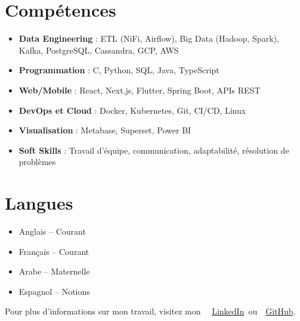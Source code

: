 \documentclass[10pt,a4paper,sans]{moderncv}
\begin{document}
\section{\fontsize{11}{12.1}\selectfont Compétences}
\vspace{-6pt}
\begin{itemize}[leftmargin=0.3cm, itemsep=-2pt, topsep=0pt, partopsep=0pt, parsep=0pt]
  \item \textbf{Data Engineering} : ETL (NiFi, Airflow), Big Data (Hadoop, Spark), Kafka, PostgreSQL, Cassandra, GCP, AWS
  \item \textbf{Programmation} : C, Python, SQL, Java, TypeScript
  \item \textbf{Web/Mobile} : React, Next.js, Flutter, Spring Boot, APIs REST
  \item \textbf{DevOps et Cloud} : Docker, Kubernetes, Git, CI/CD, Linux
  \item \textbf{Visualisation} : Metabase, Superset, Power BI
  \item \textbf{Soft Skills} : Travail d’équipe, communication, adaptabilité, résolution de problèmes
\end{itemize}

\vspace{-17pt}
\section{\fontsize{11}{12.1}\selectfont Langues}
\vspace{-16pt}
\begin{multicols}{2}
\begin{itemize}[leftmargin=0.3cm, itemsep=-2pt, topsep=0pt, partopsep=0pt, parsep=0pt]
    \item Anglais – Courant
    \item Français – Courant
    \item Arabe – Maternelle
    \item Espagnol – Notions
\end{itemize}
\end{multicols}


\vspace{-21pt}
\begin{center}
    {\fontsize{9}{11}\selectfont\color{gray}
    Pour plus d'informations sur mon travail, visitez mon~
    \faLinkedin~\href{https://www.linkedin.com/in/ahmed-makroum/}{LinkedIn}~ou~\faGithub~\href{https://github.com/ahmedmakroum}{GitHub}.}
\end{center}
\end{document}
